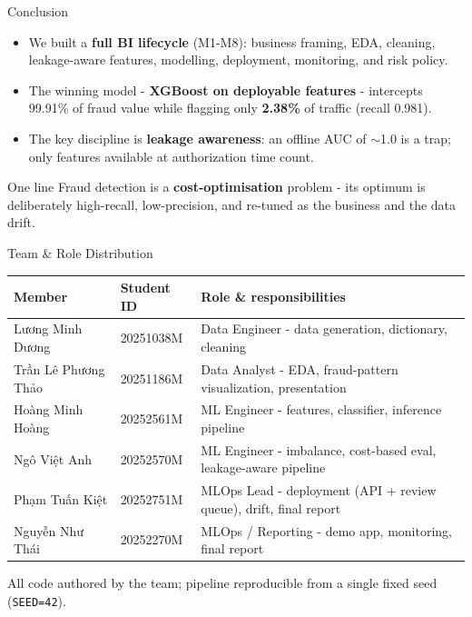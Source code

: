\documentclass[t, aspectratio=169]{beamer} %
\begin{document}
\begin{frame}{Conclusion}
	\begin{itemize}
		\item We built a \textbf{full BI lifecycle} (M1-M8): business framing,
		      EDA, cleaning, leakage-aware features, modelling, deployment,
		      monitoring, and risk policy.
		\item The winning model - \textbf{XGBoost on deployable features} -
		      intercepts \alert{99.91\%} of fraud value while flagging only
		      \textbf{2.38\%} of traffic (recall 0.981).
		\item The key discipline is \textbf{leakage awareness}: an offline
		      AUC of $\sim$1.0 is a trap; only features available at
		      authorization time count.
	\end{itemize}
	\begin{block}{One line}
		Fraud detection is a \textbf{cost-optimisation} problem - its optimum is
		deliberately high-recall, low-precision, and re-tuned as the business
		and the data drift.
	\end{block}
\end{frame}

\begin{frame}{Team \& Role Distribution}
	\centering
	\footnotesize
	\setlength{\tabcolsep}{5pt}
	\begin{tabular}{@{}l l p{8.3cm}@{}}
		\toprule
		\textbf{Member} & \textbf{Student ID} & \textbf{Role \& responsibilities} \\
		\midrule
		Lương Minh Dương    & 20251038M & Data Engineer - data generation, dictionary, cleaning \\
		Trần Lê Phương Thảo & 20251186M & Data Analyst - EDA, fraud-pattern visualization, presentation \\
		Hoàng Minh Hoàng    & 20252561M & ML Engineer - features, classifier, inference pipeline \\
		Ngô Việt Anh        & 20252570M & ML Engineer - imbalance, cost-based eval, leakage-aware pipeline \\
		Phạm Tuấn Kiệt      & 20252751M & MLOps Lead - deployment (API + review queue), drift, final report \\
		Nguyễn Như Thái     & 20252270M & MLOps / Reporting - demo app, monitoring, final report \\
		\bottomrule
	\end{tabular}
	\vspace{0.8em}

	\normalsize All code authored by the team; pipeline reproducible from a
	single fixed seed (\texttt{SEED=42}).
\end{frame}

\hustthankyou
\end{document}

